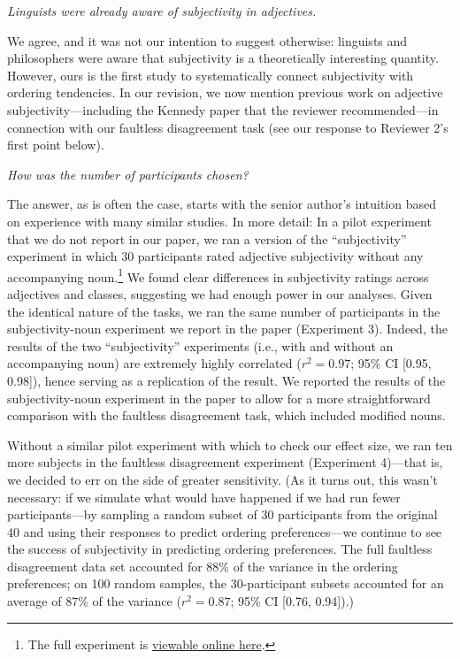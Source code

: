 \documentclass[12pt]{article}
\begin{document}
\item \emph{Linguists were already aware of subjectivity in adjectives.}

We agree, and it was not our intention to suggest otherwise: linguists and philosophers were aware that subjectivity is a theoretically interesting quantity. However, ours is the first study to systematically connect subjectivity with ordering tendencies. In our revision, we now mention previous work on adjective subjectivity---including the Kennedy paper that the reviewer recommended---in connection with our faultless disagreement task (see our response to Reviewer 2's first point below).

\item \emph{How was the number of participants chosen?}

The answer, as is often the case, starts with the senior author's intuition based on experience with many similar studies. In more detail: In a pilot experiment that we do not report in our paper, we ran a version of the ``subjectivity'' experiment in which 30 participants rated adjective subjectivity without any accompanying noun.\footnote{The full experiment is \href{http://web.stanford.edu/~scontras/adjective_ordering/experiments/6-subjectivity/subjectivity.html}{viewable online here}.} We found clear differences in subjectivity ratings across adjectives and classes, suggesting we had enough power in our analyses. 
Given the identical nature of the tasks, we ran the same number of participants in the subjectivity-noun experiment we report in the paper (Experiment 3). Indeed, the results of the two ``subjectivity'' experiments (i.e., with and without an accompanying noun) are extremely highly correlated ($r^2=0.97$; 95\% CI [0.95,  0.98]), hence serving as a replication of the result. We reported the results of the subjectivity-noun experiment in the paper to allow for a more straightforward comparison with the faultless disagreement task, which included modified nouns.

Without a similar pilot experiment with which to check our effect size, we ran ten more subjects in the faultless disagreement experiment (Experiment 4)---that is, we decided to err on the side of greater sensitivity. (As it turns out, this wasn't necessary: if we simulate what would have happened if we had run fewer participants---by sampling a random subset of 30 participants from the original 40 and using their responses to predict ordering preferences---we continue to see the success of subjectivity in predicting ordering preferences. The full faultless disagreement data set accounted for 88\% of the variance in the ordering preferences; on 100 random samples, the 30-participant subsets accounted for an average of 87\% of the variance ($r^2=0.87$; 95\% CI [0.76, 0.94]).)
\end{document}
